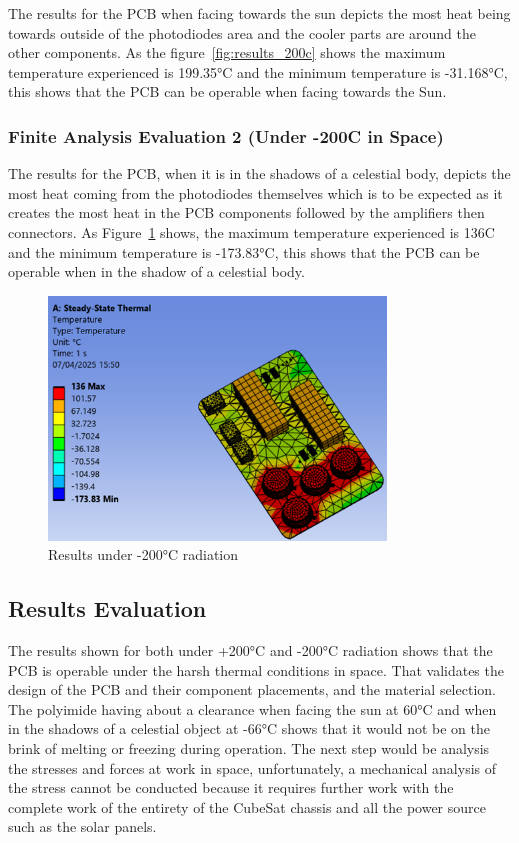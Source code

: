 The results for the PCB when facing towards the sun
depicts the most heat being towards outside of the photodiodes area and
the cooler parts are around the other components. As the figure~\ref{fig:results_200c}
shows the maximum temperature experienced is 199.35°C and the minimum
temperature is -31.168°C, this shows that the PCB can be operable when
facing towards the Sun.




\subsubsection{Finite Analysis Evaluation 2 (Under -200C in Space)}

The results for the PCB, when it is in the shadows of a celestial body, depicts the most heat coming from the photodiodes themselves which is to be expected as it creates the most heat in the PCB components followed by the amplifiers then connectors. As Figure~\ref{fig:results_minus_200C}  shows, the maximum temperature experienced is 136C and the minimum temperature is -173.83°C, this shows that the PCB can be operable when in the shadow of a celestial body.

\begin{figure}[htbp]
    \centering
    \includegraphics[width=0.8\textwidth]{chapters/methodology/ThermalAnalysis/Fig3underneg200c.png}
    \caption{Results under -200°C radiation}
    \label{fig:results_minus_200C}
\end{figure}

\subsection{Results Evaluation}

The results shown for both under +200°C and -200°C radiation shows that
the PCB is operable under the harsh thermal conditions in space. That
validates the design of the PCB and their component placements, and the
material selection. The polyimide having about a clearance when facing
the sun at 60°C and when in the shadows of a celestial object at -66°C
shows that it would not be on the brink of melting or freezing during
operation. The next step would be analysis the stresses and forces at
work in space, unfortunately, a mechanical analysis of the stress cannot
be conducted because it requires further work with the complete work of
the entirety of the CubeSat chassis and all the power source such as the
solar panels.
